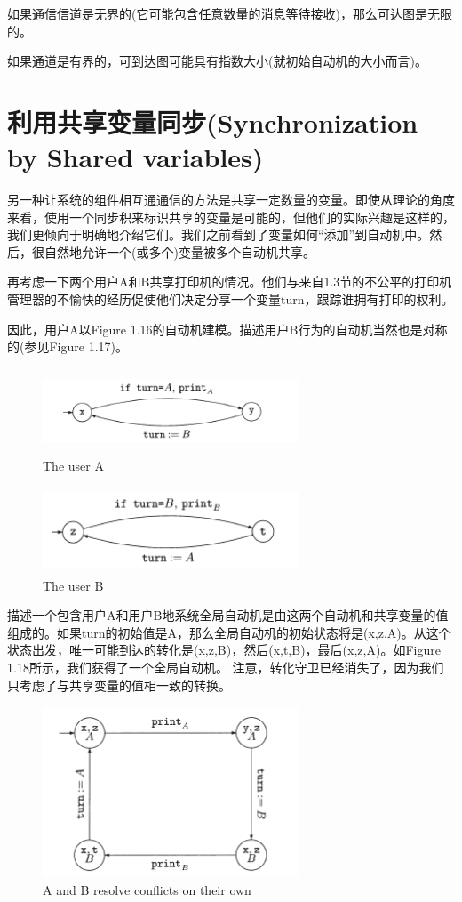 \documentclass{book}
\begin{document}
    如果通信信道是无界的(它可能包含任意数量的消息等待接收)，那么可达图是无限的。
    
    如果通道是有界的，可到达图可能具有指数大小(就初始自动机的大小而言)。

    \section{利用共享变量同步(Synchronization by Shared variables)}
    另一种让系统的组件相互通通信的方法是共享一定数量的变量。即使从理论的角度来看，使用一个同步积来标识共享的变量是可能的，但他们的实际兴趣是这样的，我们更倾向于明确地介绍它们。我们之前看到了变量如何“添加”到自动机中。然后，很自然地允许一个(或多个)变量被多个自动机共享。

    再考虑一下两个用户A和B共享打印机的情况。他们与来自1.3节的不公平的打印机管理器的不愉快的经历促使他们决定分享一个变量turn，跟踪谁拥有打印的权利。
    
    因此，用户A以Figure 1.16的自动机建模。描述用户B行为的自动机当然也是对称的(参见Figure 1.17)。
    \begin{figure}
    \centering
    \includegraphics[height=1in,width=3.0in]{1_16.png}
    \caption{The user A}
    \end{figure}
    \begin{figure}
    \centering
    \includegraphics[height=1in,width=3.0in]{1_17.png}
    \caption{The user B}
    \end{figure}

    描述一个包含用户A和用户B地系统全局自动机是由这两个自动机和共享变量的值组成的。如果turn的初始值是A，那么全局自动机的初始状态将是(x,z,A)。从这个状态出发，唯一可能到达的转化是(x,z,B)，然后(x,t,B)，最后(x,z,A)。如Figure 1.18所示，我们获得了一个全局自动机。
    注意，转化守卫已经消失了，因为我们只考虑了与共享变量的值相一致的转换。
    \begin{figure}
    \centering
    \includegraphics[height=2in,width=3.0in]{1_18.png}
    \caption{A and B resolve conflicts on their own}
    \end{figure}
\end{document}
